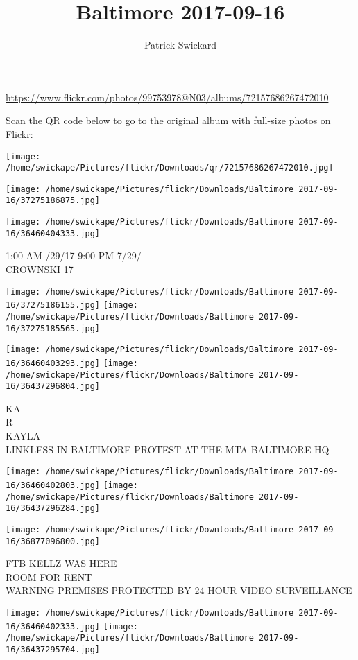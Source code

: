 \documentclass[10pt,letterpaper]{article}
\title{Baltimore 2017-09-16}
\author{Patrick Swickard}
\date{}
\begin{document}
\maketitle

\url{https://www.flickr.com/photos/99753978@N03/albums/72157686267472010}

Scan the QR code below to go to the original album with full-size photos on Flickr:

\texttt{[image: /home/swickape/Pictures/flickr/Downloads/qr/72157686267472010.jpg]}
\pagebreak

\texttt{[image: /home/swickape/Pictures/flickr/Downloads/Baltimore 2017-09-16/37275186875.jpg]}

\vspace{0.25in}
\texttt{[image: /home/swickape/Pictures/flickr/Downloads/Baltimore 2017-09-16/36460404333.jpg]}

1:00 AM /29/17 9:00 PM 7/29/\\
CROWNSKI 17
\pagebreak

\texttt{[image: /home/swickape/Pictures/flickr/Downloads/Baltimore 2017-09-16/37275186155.jpg]}
\texttt{[image: /home/swickape/Pictures/flickr/Downloads/Baltimore 2017-09-16/37275185565.jpg]}

\texttt{[image: /home/swickape/Pictures/flickr/Downloads/Baltimore 2017-09-16/36460403293.jpg]}
\texttt{[image: /home/swickape/Pictures/flickr/Downloads/Baltimore 2017-09-16/36437296804.jpg]}

KA\\
R\\
KAYLA\\
LINKLESS IN BALTIMORE PROTEST AT THE MTA BALTIMORE HQ
\pagebreak

\texttt{[image: /home/swickape/Pictures/flickr/Downloads/Baltimore 2017-09-16/36460402803.jpg]}
\texttt{[image: /home/swickape/Pictures/flickr/Downloads/Baltimore 2017-09-16/36437296284.jpg]}

\vspace{0.25in}
\texttt{[image: /home/swickape/Pictures/flickr/Downloads/Baltimore 2017-09-16/36877096800.jpg]}

FTB KELLZ WAS HERE\\
ROOM FOR RENT\\
WARNING PREMISES PROTECTED BY 24 HOUR VIDEO SURVEILLANCE
\pagebreak

\texttt{[image: /home/swickape/Pictures/flickr/Downloads/Baltimore 2017-09-16/36460402333.jpg]}
\texttt{[image: /home/swickape/Pictures/flickr/Downloads/Baltimore 2017-09-16/36437295704.jpg]}
\end{document}
